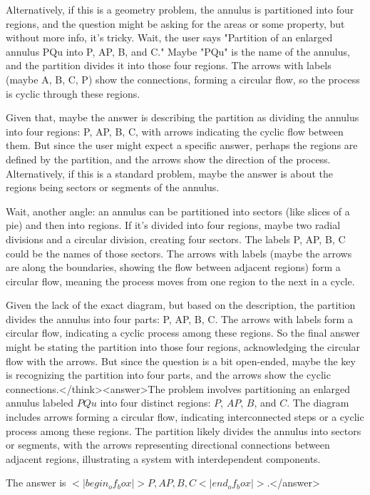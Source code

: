 Alternatively, if this is a geometry problem, the annulus is partitioned into four regions, and the question might be asking for the areas or some property, but without more info, it's tricky. Wait, the user says "Partition of an enlarged annulus PQu into P, AP, B, and C." Maybe "PQu" is the name of the annulus, and the partition divides it into those four regions. The arrows with labels (maybe A, B, C, P) show the connections, forming a circular flow, so the process is cyclic through these regions.

Given that, maybe the answer is describing the partition as dividing the annulus into four regions: P, AP, B, C, with arrows indicating the cyclic flow between them. But since the user might expect a specific answer, perhaps the regions are defined by the partition, and the arrows show the direction of the process. Alternatively, if this is a standard problem, maybe the answer is about the regions being sectors or segments of the annulus.

Wait, another angle: an annulus can be partitioned into sectors (like slices of a pie) and then into regions. If it's divided into four regions, maybe two radial divisions and a circular division, creating four sectors. The labels P, AP, B, C could be the names of those sectors. The arrows with labels (maybe the arrows are along the boundaries, showing the flow between adjacent regions) form a circular flow, meaning the process moves from one region to the next in a cycle.

Given the lack of the exact diagram, but based on the description, the partition divides the annulus into four parts: P, AP, B, C. The arrows with labels form a circular flow, indicating a cyclic process among these regions. So the final answer might be stating the partition into those four regions, acknowledging the circular flow with the arrows. But since the question is a bit open-ended, maybe the key is recognizing the partition into four parts, and the arrows show the cyclic connections.</think><answer>The problem involves partitioning an enlarged annulus labeled \( PQu \) into four distinct regions: \( P \), \( AP \), \( B \), and \( C \). The diagram includes arrows forming a circular flow, indicating interconnected steps or a cyclic process among these regions. The partition likely divides the annulus into sectors or segments, with the arrows representing directional connections between adjacent regions, illustrating a system with interdependent components.  

The answer is \(<|begin_of_box|>P, AP, B, C<|end_of_box|>\).</answer>